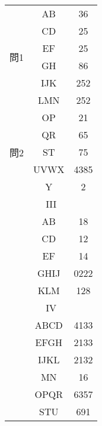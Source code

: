 \documentclass{jsarticle}
\begin{document}
\begin{CJK}{UTF8}{min}
\begin{table}[htbp]
\begin{minipage}[t]{0.48\textwidth}
\begin{tabular}{|c|c|c|}
\hline
\multirow{6}{*}{問1} 
 & \textsf{AB} & 36 \\
 & \textsf{CD} & 25 \\
 & \textsf{EF} & 25 \\
 & \textsf{GH} & 86 \\
 & \textsf{IJK} & 252 \\
 & \textsf{LMN} & 252 \\
\hline
\multirow{5}{*}{問2} 
 & \textsf{OP} & 21 \\
 & \textsf{QR} & 65 \\
 & \textsf{ST} & 75 \\
 & \textsf{UVWX} & 4385 \\
 & \textsf{Y} & 2 \\
\hline
\multicolumn{3}{|c|}{III} \\
\hline
 & \textsf{AB} & 18 \\
 & \textsf{CD} & 12 \\
 & \textsf{EF} & 14\\
 & \textsf{GHIJ} & 0222 \\
 & \textsf{KLM} & 128 \\
\hline
\multicolumn{3}{|c|}{IV} \\
\hline
 & \textsf{ABCD} & 4133 \\
 & \textsf{EFGH} & 2133 \\
 & \textsf{IJKL} & 2132 \\
 & \textsf{MN} & 16 \\
 & \textsf{OPQR} & 6357 \\
 & \textsf{STU} & 691 \\
\hline
\end{tabular}
\end{minipage}
\end{table}

\end{CJK}
\end{document}
